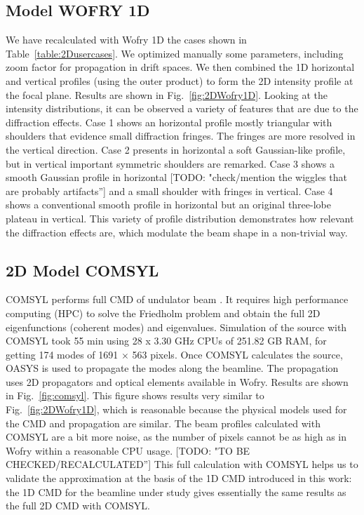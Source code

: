 \documentclass{iucr}              %
\newcommand{\todo}[1]{{\color{red}[TODO: "#1'']}}
\newcommand{\inred}[1]{{\color{red}#1}}
\begin{document}
\subsection{Model WOFRY 1D}
We have recalculated with Wofry 1D the cases shown in Table~\ref{table:2Dusercases}. We optimized manually some parameters, including zoom factor for propagation in drift spaces. We then combined the 1D horizontal and vertical profiles (using the outer product) to form the 2D intensity profile at the focal plane. Results are shown in Fig.~\ref{fig:2DWofry1D}. Looking at the intensity distributions, it can be observed a variety of features that are due to the diffraction effects. Case 1 shows an horizontal profile mostly triangular with shoulders that evidence small diffraction fringes. The fringes are more resolved in the vertical direction. Case 2  presents in horizontal a soft Gaussian-like profile, but in vertical important symmetric shoulders are remarked. Case 3 shows a smooth Gaussian profile in horizontal \todo{check/mention the wiggles that are probably artifacts} and a small shoulder with fringes in vertical. Case 4 shows a conventional smooth profile in horizontal but an original three-lobe plateau in vertical. This variety of profile distribution demonstrates how relevant the diffraction effects are, which modulate the beam shape in a non-trivial way.  

\subsection{2D Model COMSYL}
COMSYL performs full CMD of undulator beam \cite{glass2017}. It requires high performance computing (HPC) to solve the Friedholm problem and obtain the full 2D eigenfunctions (coherent modes) and eigenvalues.
Simulation of the source with COMSYL took 55 min using  
28 x 3.30 GHz CPUs of 251.82 GB RAM, for getting 174 modes of 1691 $\times$ 563 pixels.
Once COMSYL calculates the source, OASYS is used to propagate the modes along the beamline.
The propagation uses 2D propagators and optical elements available in Wofry. Results are shown in Fig.~\ref{fig:comsyl}. This figure shows results very similar to Fig.~\ref{fig:2DWofry1D}, which is reasonable because the physical models used for the CMD and propagation are similar. \inred{The beam profiles calculated with COMSYL are a bit more noise, as the number of pixels cannot be as high as in Wofry within a reasonable CPU usage.} \todo{TO BE CHECKED/RECALCULATED} This full calculation with COMSYL helps us to validate the approximation at the basis of the 1D CMD introduced in this work: the 1D CMD for the beamline under study gives essentially the same results as the full 2D CMD with COMSYL.
\end{document}
